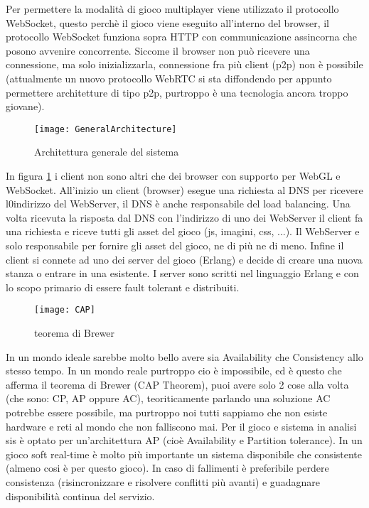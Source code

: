 \documentclass[paper=a4, fontsize=11pt]{scrartcl} %
\numberwithin{equation}{section} %
\numberwithin{figure}{section} %
\numberwithin{table}{section} %
\begin{document}
Per permettere la modalità di gioco multiplayer viene utilizzato il protocollo WebSocket, questo perchè il gioco viene eseguito all'interno del browser, il protocollo WebSocket funziona sopra HTTP con communicazione assincorna che posono avvenire concorrente. Siccome il browser non può ricevere una connessione, ma solo inizializzarla, connessione fra più client (p2p) non è possibile (attualmente un nuovo protocollo WebRTC si sta diffondendo per appunto permettere architetture di tipo p2p, purtroppo è una tecnologia ancora troppo giovane).


\begin{figure}[h]
\centering
\texttt{[image: GeneralArchitecture]}
\caption{Architettura generale del sistema}
\label{GenArc}
\end{figure}

In figura \ref{GenArc} i client non sono altri che dei browser con supporto per WebGL e WebSocket. All'inizio un client (browser) esegue una richiesta al DNS per ricevere l0indirizzo del WebServer, il DNS è anche responsabile del load balancing. Una volta ricevuta la risposta dal DNS con l'indirizzo di uno dei WebServer il client fa una richiesta e riceve tutti gli asset del gioco (js, imagini, css, ...). Il WebServer e solo responsabile per fornire gli asset del gioco, ne di più ne di meno. Infine il client si connete ad uno dei server del gioco (Erlang) e decide di creare una nuova stanza o entrare in una esistente. I server sono scritti nel linguaggio Erlang e con lo scopo primario di essere fault tolerant e distribuiti.

\begin{figure}[h]
\centering
\texttt{[image: CAP]}
\caption{teorema di Brewer}
\label{CAP}
\end{figure}

In un mondo ideale sarebbe molto bello avere sia Availability che Consistency allo stesso tempo.
In un mondo reale purtroppo cio è impossibile, ed è questo che afferma il teorema di Brewer (CAP Theorem), puoi avere solo 2 cose alla volta (che sono: CP, AP oppure AC), teoriticamente parlando una soluzione AC potrebbe essere possibile, ma purtroppo noi tutti sappiamo che non esiste hardware e reti al mondo che non falliscono mai.
Per il gioco e sistema in analisi sis è optato per un'architettura AP (cioè Availability e Partition tolerance). In un gioco soft real-time è molto più importante un sistema disponibile che consistente (almeno cosi è per questo gioco). In caso di fallimenti è preferibile perdere consistenza (risincronizzare e risolvere conflitti più avanti) e guadagnare disponibilità continua del servizio.
\end{document}
